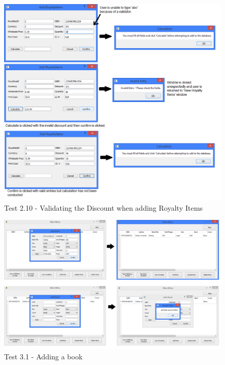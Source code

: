 \begin{landscape}
\begin{figure}[H]
    \includegraphics[width=\textwidth]{./Testing/Evidence/Series2/RoyaltyDiscountValidation.png}
    \caption{Test 2.10 -  Validating the Discount when adding Royalty Items}  \label{fig:RoyaltyDiscountValidation}
\end{figure}

\begin{figure}[H]
    \includegraphics[width=\textwidth]{./Testing/Evidence/Series3/AddBookValidation.png}
    \caption{Test 3.1 - Adding a book}  \label{fig:AddBookValidation}
\end{figure}


\end{landscape}
